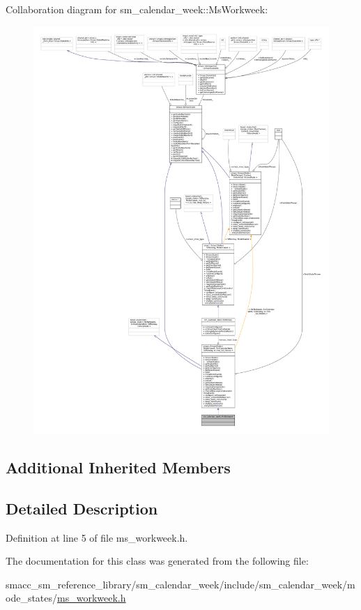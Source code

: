 Collaboration diagram for sm\+\_\+calendar\+\_\+week\+:\+:Ms\+Workweek\+:
\nopagebreak
\begin{figure}[H]
\begin{center}
\leavevmode
\includegraphics[width=350pt]{classsm__calendar__week_1_1MsWorkweek__coll__graph}
\end{center}
\end{figure}
\subsection*{Additional Inherited Members}


\subsection{Detailed Description}


Definition at line 5 of file ms\+\_\+workweek.\+h.



The documentation for this class was generated from the following file\+:\begin{DoxyCompactItemize}
\item 
smacc\+\_\+sm\+\_\+reference\+\_\+library/sm\+\_\+calendar\+\_\+week/include/sm\+\_\+calendar\+\_\+week/mode\+\_\+states/\hyperlink{sm__calendar__week_2include_2sm__calendar__week_2mode__states_2ms__workweek_8h}{ms\+\_\+workweek.\+h}\end{DoxyCompactItemize}
